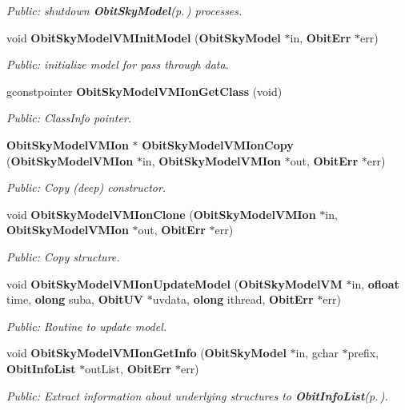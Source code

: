 \begin{CompactItemize}
\begin{CompactList}\small\item\em Public: shutdown {\bf Obit\-Sky\-Model}{\rm (p.\,\pageref{structObitSkyModel})} processes. \item\end{CompactList}\item 
void {\bf Obit\-Sky\-Model\-VMInit\-Model} ({\bf Obit\-Sky\-Model} $\ast$in, {\bf Obit\-Err} $\ast$err)
\begin{CompactList}\small\item\em Public: initialize model for pass through data. \item\end{CompactList}\item 
gconstpointer {\bf Obit\-Sky\-Model\-VMIon\-Get\-Class} (void)
\begin{CompactList}\small\item\em Public: Class\-Info pointer. \item\end{CompactList}\item 
{\bf Obit\-Sky\-Model\-VMIon} $\ast$ {\bf Obit\-Sky\-Model\-VMIon\-Copy} ({\bf Obit\-Sky\-Model\-VMIon} $\ast$in, {\bf Obit\-Sky\-Model\-VMIon} $\ast$out, {\bf Obit\-Err} $\ast$err)
\begin{CompactList}\small\item\em Public: Copy (deep) constructor. \item\end{CompactList}\item 
void {\bf Obit\-Sky\-Model\-VMIon\-Clone} ({\bf Obit\-Sky\-Model\-VMIon} $\ast$in, {\bf Obit\-Sky\-Model\-VMIon} $\ast$out, {\bf Obit\-Err} $\ast$err)
\begin{CompactList}\small\item\em Public: Copy structure. \item\end{CompactList}\item 
void {\bf Obit\-Sky\-Model\-VMIon\-Update\-Model} ({\bf Obit\-Sky\-Model\-VM} $\ast$in, {\bf ofloat} time, {\bf olong} suba, {\bf Obit\-UV} $\ast$uvdata, {\bf olong} ithread, {\bf Obit\-Err} $\ast$err)
\begin{CompactList}\small\item\em Public: Routine to update model. \item\end{CompactList}\item 
void {\bf Obit\-Sky\-Model\-VMIon\-Get\-Info} ({\bf Obit\-Sky\-Model} $\ast$in, gchar $\ast$prefix, {\bf Obit\-Info\-List} $\ast$out\-List, {\bf Obit\-Err} $\ast$err)
\begin{CompactList}\small\item\em Public: Extract information about underlying structures to {\bf Obit\-Info\-List}{\rm (p.\,\pageref{structObitInfoList})}. \item\end{CompactList}\end{CompactItemize}


